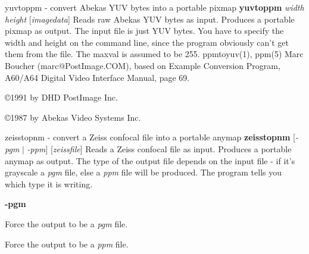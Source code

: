 %

\newpage
%

yuvtoppm - convert Abekas YUV bytes into a portable pixmap
{\bf yuvtoppm}
{\it width height}
{\rm [}{\it imagedata}{\rm ]}
Reads raw Abekas YUV bytes as input.
Produces a portable pixmap as output.
The input file is just YUV bytes.
You have to specify the width and height on the command line,
since the program obviously can't get them from the file.
The maxval is assumed to be 255.
ppmtoyuv(1), ppm(5)
Marc Boucher (marc@PostImage.COM),
based on Example Conversion Program, A60/A64 Digital Video Interface
Manual, page 69.
\par
\copyright 1991 by DHD PostImage Inc.
\par
\copyright 1987 by Abekas Video Systems Inc.
%
 
%

\newpage
%

zeisstopnm - convert a Zeiss confocal file into a portable anymap
{\bf zeisstopnm}
{\rm [}{\it -pgm}
$|$
{\it -ppm}{\rm ]}
{\rm [}{\it zeissfile}{\rm ]}
Reads a Zeiss confocal file as input.
Produces a portable anymap as output.
The type of the output file depends on the input file -
if it's grayscale a
{\it pgm}
file, else a
{\it ppm}
file will be produced.
The program tells you which type it is writing.
\begin{TPlist}{{\bf -pgm}}
\item[{{\bf -pgm}}]
Force the output to be a
{\it pgm}
file.
\item[{{\bf -ppm}}]
Force the output to be a
{\it ppm}
file.
\end{TPlist}

